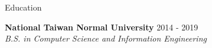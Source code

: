 \documentclass{resume} %
\begin{document}

\begin{rSection}{Education}

{\bf National Taiwan Normal University} \hfill {2014 - 2019} \\
{\em B.S. in Computer Science and Information Engineering}

\end{rSection}

\end{document}
